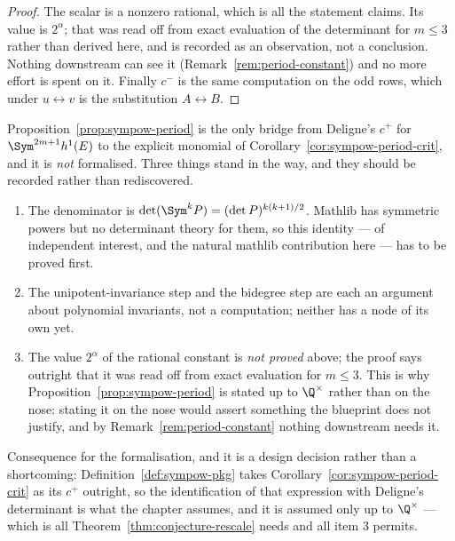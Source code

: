\begin{proof}
  The scalar is a nonzero rational, which is all the statement claims. Its value is
  $2^{\alpha}$; that was read off from exact evaluation of the determinant for $m \leq 3$
  rather than derived here, and is recorded as an observation, not a conclusion. Nothing
  downstream can see it (Remark~\ref{rem:period-constant}) and no more effort is spent on it. Finally
  $c^{-}$ is the same computation on the odd rows, which under $u \leftrightarrow v$ is the
  substitution $A \leftrightarrow B$.
\end{proof}

\begin{remark}
  \label{rem:sympow-period-formalisation}
  Proposition~\ref{prop:sympow-period} is the only bridge from Deligne's $c^{+}$ for
  $\Sym^{2m+1}h^{1}(E)$ to the explicit monomial of Corollary~\ref{cor:sympow-period-crit},
  and it is \emph{not} formalised. Three things stand in the way, and they should be recorded
  rather than rediscovered.
  \begin{enumerate}
    \item The denominator is $\det(\Sym^{k}P) = (\det P)^{k(k+1)/2}$. Mathlib has symmetric
      powers but no determinant theory for them, so this identity --- of independent interest,
      and the natural mathlib contribution here --- has to be proved first.
    \item The unipotent-invariance step and the bidegree step are each an argument about
      polynomial invariants, not a computation; neither has a node of its own yet.
    \item The value $2^{\alpha}$ of the rational constant is \emph{not proved} above; the
      proof says outright that it was read off from exact evaluation for $m \leq 3$. This is
      why Proposition~\ref{prop:sympow-period} is stated up to $\Q^{\times}$ rather than on the
      nose: stating it on the nose would assert something the blueprint does not justify, and
      by Remark~\ref{rem:period-constant} nothing downstream needs it.
  \end{enumerate}
  Consequence for the formalisation, and it is a design decision rather than a shortcoming:
  Definition~\ref{def:sympow-pkg} takes Corollary~\ref{cor:sympow-period-crit} as its
  $c^{+}$ outright, so the identification of that expression with Deligne's determinant is
  what the chapter assumes, and it is assumed only up to $\Q^{\times}$ --- which is all
  Theorem~\ref{thm:conjecture-rescale} needs and all item 3 permits.
\end{remark}

